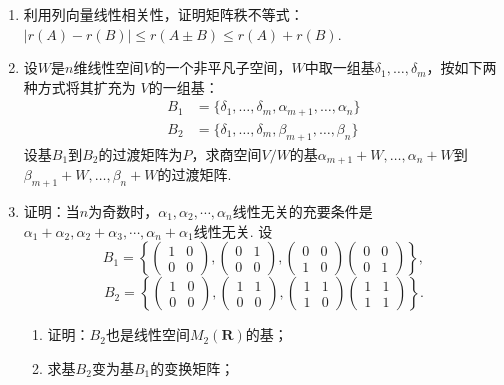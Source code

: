 \begin{enumerate}
    \item 利用列向量线性相关性，证明矩阵秩不等式：$|r(A)-r(B)|\le r(A\pm B) \le r(A)+r(B)$.
    \item 设$W$是$n$维线性空间$V$的一个非平凡子空间，$W$中取一组基$\delta_1,\ldots,\delta_m$，按如下两种方式将其扩充为
    $V$的一组基：
    \begin{align*}
        B_1&=\{\delta_1,\ldots,\delta_m,\alpha_{m+1},\ldots,\alpha_n\} \\
        B_2&=\{\delta_1,\ldots,\delta_m,\beta_{m+1},\ldots,\beta_n\}
    \end{align*}
    设基$B_1$到$B_2$的过渡矩阵为$P$，求商空间$V/W$的基$\alpha_{m+1}+W,\ldots,\alpha_n+W$到
    $\beta_{m+1}+W,\ldots,\beta_n+W$的过渡矩阵.
    \item 证明：当$n$为奇数时，$\alpha_1,\alpha_2,\cdots,\alpha_n$线性无关的充要条件是
	$\alpha_1+\alpha_2,\alpha_2+\alpha_3,\cdots,\alpha_n+\alpha_1$线性无关.
    设
	\[B_1=\left\{\begin{pmatrix}
		1 & 0 \\ 0 & 0
	\end{pmatrix},\begin{pmatrix}
		0 & 1 \\ 0 & 0
	\end{pmatrix},\begin{pmatrix}
		0 & 0 \\ 1 & 0
	\end{pmatrix}\begin{pmatrix}
		0 & 0 \\ 0 & 1
	\end{pmatrix}\right\},\]
	\[B_2=\left\{\begin{pmatrix}
		1 & 0 \\ 0 & 0
	\end{pmatrix},\begin{pmatrix}
		1 & 1 \\ 0 & 0
	\end{pmatrix},\begin{pmatrix}
		1 & 1 \\ 1 & 0
	\end{pmatrix}\begin{pmatrix}
		1 & 1 \\ 1 & 1
	\end{pmatrix}\right\}.\]
    \begin{enumerate}[label=(\arabic*)]
        \item 证明：$B_2$也是线性空间$M_2(\mathbf{R})$的基；
        \item 求基$B_2$变为基$B_1$的变换矩阵；

\end{enumerate}
\end{enumerate}
